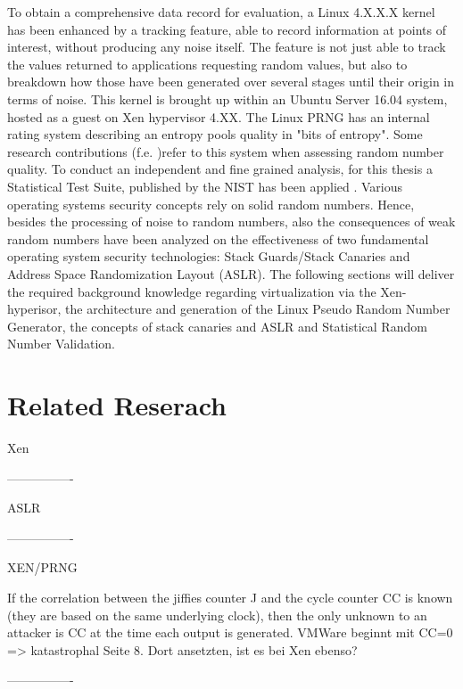 To obtain a comprehensive data record for evaluation, a Linux 4.X.X.X kernel has been enhanced by a tracking feature, able to record information at points of interest, without producing any noise itself. The feature is not just able to track the values returned to applications requesting random values, but also to breakdown how those have been generated over several stages until their origin in terms of noise. This kernel is brought up within an Ubuntu Server 16.04 system, hosted as a guest on Xen hypervisor 4.XX. The Linux PRNG has an internal rating system describing an entropy pools quality in "bits of entropy". Some research contributions (f.e. \cite{lacharme2012linux})refer to this system when assessing random number quality. To conduct an independent and fine grained analysis, for this thesis a Statistical Test Suite, published by the NIST has been applied \cite{paul2016nist}. Various operating systems security concepts rely on solid random numbers. Hence, besides the processing of noise to random numbers, also the consequences of weak random numbers have been analyzed on the effectiveness of two fundamental operating system security technologies: Stack Guards/Stack Canaries and Address Space Randomization Layout (ASLR).
The following sections will deliver the required background knowledge regarding virtualization via the Xen-hyperisor, the architecture and generation of the Linux Pseudo Random Number Generator, the concepts of stack canaries and ASLR and Statistical Random Number Validation. 



\section{Related Reserach}

Xen

----------------

ASLR

----------------

XEN/PRNG

If the correlation between the jiffies counter J and the cycle counter CC is known (they are based on the same underlying clock), then the only unknown to an attacker is CC at the time each output is generated. \cite{everspaugh2014not} VMWare beginnt mit CC=0 => katastrophal \cite{everspaugh2014not} Seite 8. Dort ansetzten, ist es bei Xen ebenso?

----------------












   






